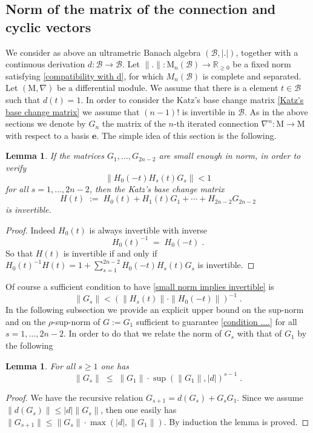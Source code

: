 \documentclass{compositio}
\newtheorem{lemma}[theorem]{Lemma}
\numberwithin{equation}{section}
\begin{document}
\subsection{Norm of the matrix of the connection and cyclic vectors}
We consider as above an ultrametric Banach algebra $({\mathscr{B}},|.|)$, together with a continuous derivation $d:{\mathscr{B}}\to{\mathscr{B}}$.
Let $\|.\|:{\mathrm{M}}_n({\mathscr{B}})\to\mathbb{R}_{\geq 0}$ be a fixed norm 
satisfying \eqref{compatibility with d}, for which 
$M_n({\mathscr{B}})$ is complete and separated. Let $({\mathrm{M}},\nabla)$ be a differential module. We assume 
that there is a element $t\in{\mathscr{B}}$ such that $d(t)=1$. 
In order to consider the Katz's base change matrix \eqref{Katz's base change matrix} we assume that $(n-1)!$ is 
invertible in ${\mathscr{B}}$.
As in the above sections we denote by $G_n$ the matrix of the $n$-th iterated 
connection $\nabla^n:{\mathrm{M}}\to{\mathrm{M}}$ with respect to a basis ${\mathbf{e}}$. The simple idea of this section is the following. 
\begin{lemma}
If the matrices 
$G_1,\ldots,G_{2n-2}$ are small enough in norm, in order to verify 
\begin{equation}\label{small norm implies invertible}
\|H_0(-t)H_s(t)G_s\|<1
\end{equation} for all $s=1,\ldots,2n-2$, 
then the Katz's base change matrix 
\begin{equation}
H(t)\;:=\;H_0(t)+H_1(t)G_1+\cdots+H_{2n-2}G_{2n-2}
\end{equation} 
is invertible. 
\end{lemma}
\begin{proof}
Indeed $H_0(t)$ is always invertible with inverse 
\begin{equation}
H_0(t)^{-1}\;=\;H_0(-t)\;.
\end{equation} 
So that $H(t)$ is invertible if and only if 
$H_0(t)^{-1}H(t)=1+\sum_{s=1}^{2n-2}H_0(-t)H_s(t)G_s$ is invertible. 
\end{proof} 
Of course a sufficient condition to have \eqref{small norm implies invertible} is 
\begin{equation}\label{condition ....}
\|G_s\|<(\|H_s(t)\|\cdot\|H_0(-t)\|)^{-1}\;.
\end{equation}
In the following subsection we provide an explicit upper bound on the sup-norm 
and on the $\rho$-sup-norm of 
$G:=G_1$ sufficient to guarantee \eqref{condition ....} for all $s=1,\ldots,2n-2$. In order to do that we relate the 
norm of $G_s$ with that of $G_1$ by the following
\begin{lemma}\label{G_s+1 les G_1^s}
For all $s\geq 1$ one has
\begin{equation}
\|G_s\|\;\leq\;\|G_1\|\cdot\sup(\|G_1\|,|d|)^{s-1}\;.
\end{equation}
\end{lemma}
\begin{proof}
We have the recursive relation $G_{s+1}=d(G_s)+G_sG_1$. Since we assume $\|d(G_s)\|\leq|d|\|G_s\|$, then one easily has 
$\|G_{s+1}\|\leq \|G_s\|\cdot\max(|d|,\|G_1\|)$. By induction the lemma is proved.
\end{proof}
\end{document}
